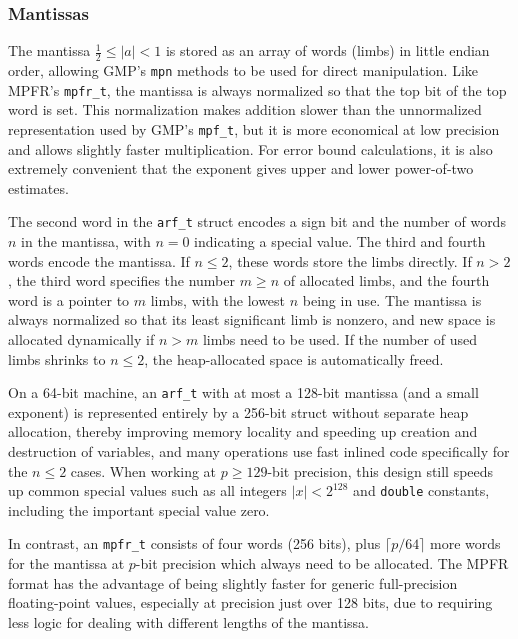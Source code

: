 \documentclass[10pt,journal,compsoc,cspaper]{IEEEtran}
\begin{document}
\subsubsection{Mantissas}

The mantissa $\tfrac{1}{2} \le |a| < 1$ is stored as an array of words (limbs)
in little endian order, allowing GMP's \texttt{mpn} methods
to be used for direct manipulation.
Like MPFR's \texttt{mpfr\_t}, the mantissa is always normalized
so that the top bit of the top word is set.
This normalization makes addition slower than the unnormalized
representation used by GMP's \texttt{mpf\_t}, but it is more
economical at low precision and allows slightly faster multiplication.
For error bound calculations, it is also extremely convenient
that the exponent gives upper and lower power-of-two estimates.

The second word in the \texttt{arf\_t} struct
encodes a sign bit and the number of words
$n$ in the mantissa, with $n = 0$ indicating a special value.
The third and fourth words encode the mantissa.
If $n \le 2$, these words store the limbs directly.
If $n > 2$, the third word specifies the number $m \ge n$ of allocated
limbs, and the fourth word is a pointer to $m$ limbs,
with the lowest $n$ being in use.
The mantissa is always normalized so that its
least significant limb is nonzero, and new space is allocated
dynamically if $n > m$ limbs need to be used.
If the number of used limbs shrinks to $n \le 2$,
the heap-allocated space is automatically freed.

On a 64-bit machine, an \texttt{arf\_t} with at most a
128-bit mantissa (and a small exponent) is represented entirely by a 256-bit
struct without separate heap allocation, 
thereby improving memory locality
and speeding up creation and destruction of variables,
and many operations use fast inlined code specifically for the $n \le 2$ cases.
When working at $p \ge 129$-bit precision, this design still
speeds up common special values such as all integers $|x| < 2^{128}$
and \texttt{double} constants, including the important special value zero.

In contrast, an \texttt{mpfr\_t} consists of four words (256 bits), plus
$\lceil p / 64 \rceil$ more words for the mantissa at $p$-bit precision which always
need to be allocated.
The MPFR format has the advantage of being slightly faster for
generic full-precision floating-point values, especially at
precision just over 128 bits, due to requiring less
logic for dealing with different lengths of the mantissa.
\end{document}
